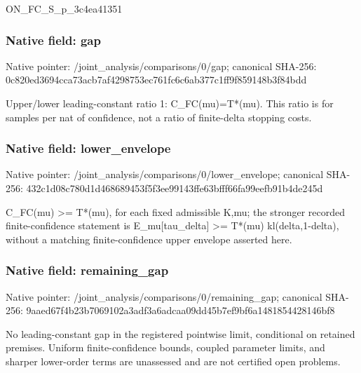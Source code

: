 \documentclass[10pt,a4paper]{article}
\begin{document}
\begingroup\raggedright\sloppy ON\_\allowbreak{}FC\_\allowbreak{}S\_\allowbreak{}p\_\allowbreak{}3c4ea41351\par\endgroup

\subsubsection{Native field: gap}
Native pointer: /joint\_\allowbreak{}analysis/comparisons/0/gap; canonical SHA-256: 0c820ed3694cca73acb7af4298753ec761fc6c6ab377c1ff9f859148b3f84bdd

\begingroup\raggedright\sloppy Upper/\allowbreak{}lower leading-constant ratio 1:\allowbreak{} C\_\allowbreak{}FC(mu)=\allowbreak{}T*(mu). This ratio is for samples per nat of confidence,\allowbreak{} not a ratio of finite-delta stopping costs.\par\endgroup

\subsubsection{Native field: lower\_\allowbreak{}envelope}
Native pointer: /joint\_\allowbreak{}analysis/comparisons/0/lower\_\allowbreak{}envelope; canonical SHA-256: 432c1d08c780d1d468689453f5f3ee99143ffe63bfff66fa99eefb91b4de245d

\begingroup\raggedright\sloppy C\_\allowbreak{}FC(mu) >=\allowbreak{} T*(mu),\allowbreak{} for each fixed admissible K,\allowbreak{}mu;\allowbreak{} the stronger recorded finite-confidence statement is E\_\allowbreak{}mu[tau\_\allowbreak{}delta] >=\allowbreak{} T*(mu) kl(delta,\allowbreak{}1-delta),\allowbreak{} without a matching finite-confidence upper envelope asserted here.\par\endgroup

\subsubsection{Native field: remaining\_\allowbreak{}gap}
Native pointer: /joint\_\allowbreak{}analysis/comparisons/0/remaining\_\allowbreak{}gap; canonical SHA-256: 9aaed67f4b23b7069102a3adf3a6adcaa09dd45b7ef9bf6a1481854428146bf8

\begingroup\raggedright\sloppy No leading-constant gap in the registered pointwise limit,\allowbreak{} conditional on retained premises. Uniform finite-confidence bounds,\allowbreak{} coupled parameter limits,\allowbreak{} and sharper lower-order terms are unassessed and are not certified open problems.\par\endgroup
\end{document}

